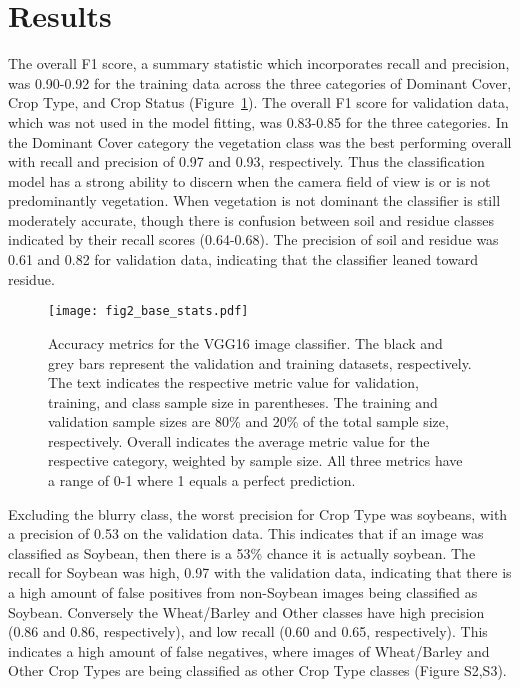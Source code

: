 \documentclass[remotesensing,article,submit,moreauthors,pdftex]{Definitions/mdpi}
\begin{document}
\section{Results}

The overall F1 score, a summary statistic which incorporates recall and precision, was 0.90-0.92 for the training data across the three categories of Dominant Cover, Crop Type, and Crop Status (Figure~\ref{fig2}). The overall F1 score for validation data, which was not used in the model fitting, was 0.83-0.85 for the three categories. In the Dominant Cover category the vegetation class was the best performing overall with recall and precision of 0.97 and 0.93, respectively. Thus the classification model has a strong ability to discern when the camera field of view is or is not predominantly vegetation. When vegetation is not dominant the classifier is still moderately accurate, though there is confusion between soil and residue classes indicated by their recall scores (0.64-0.68). The precision of soil and residue was 0.61 and 0.82 for validation data, indicating that the classifier leaned toward residue.

\begin{figure}[H]
    \centering
    \texttt{[image: fig2\_base\_stats.pdf]}
    \caption{Accuracy metrics for the VGG16 image classifier. The black and grey bars represent the validation and training datasets, respectively. The text indicates the respective metric value for validation, training, and class sample size in parentheses. The training and validation sample sizes are 80\% and 20\% of the total sample size, respectively. Overall indicates the average metric value for the respective category, weighted by sample size. All three metrics have a range of 0-1 where 1 equals a perfect prediction.}
    \label{fig2}
\end{figure}

Excluding the blurry class, the worst precision for Crop Type was soybeans, with a precision of 0.53 on the validation data. This indicates that if an image was classified as Soybean, then there is a 53\% chance it is actually soybean. The recall for Soybean was high, 0.97 with the validation data, indicating that there is a high amount of false positives from non-Soybean images being classified as Soybean. Conversely the Wheat/Barley and Other classes have high precision (0.86 and 0.86, respectively), and low recall (0.60 and 0.65, respectively). This indicates a high amount of false negatives, where images of Wheat/Barley and Other Crop Types are being classified as other Crop Type classes (Figure S2,S3). 
\end{document}
